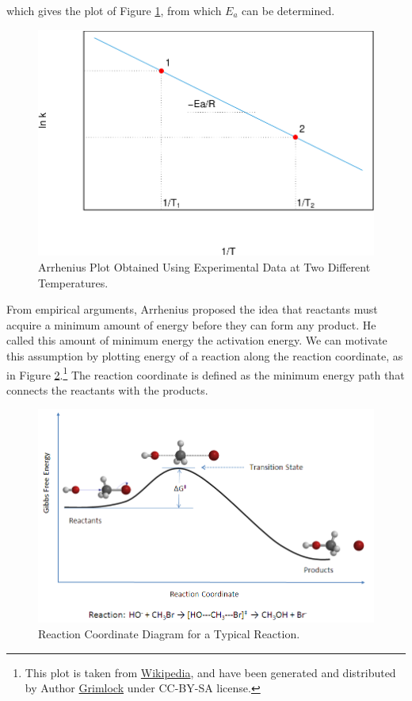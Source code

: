 \documentclass[
  9pt,
]{extbook}
\theoremstyle{definition}
\theoremstyle{definition}
\theoremstyle{definition}
\theoremstyle{remark}
\begin{document}
which gives the plot of Figure \ref{fig:figk8}, from which \(E_a\) can be determined.

\begin{figure}

{\centering \includegraphics{pchem1_files/figure-latex/figk8-1} 

}

\caption{Arrhenius Plot Obtained Using Experimental Data at Two Different Temperatures.}\label{fig:figk8}
\end{figure}

From empirical arguments, Arrhenius proposed the idea that reactants must acquire a minimum amount of energy before they can form any product. He called this amount of minimum energy the activation energy. We can motivate this assumption by plotting energy of a reaction along the reaction coordinate, as in Figure \ref{fig:figk9}.\footnote{This plot is taken from \href{https://en.wikipedia.org/wiki/Transition_state_theory}{Wikipedia}, and have been generated and distributed by Author \href{https://commons.wikimedia.org/wiki/User:Grimlock}{Grimlock} under CC-BY-SA license.} The reaction coordinate is defined as the minimum energy path that connects the reactants with the products.

\begin{figure}

{\centering \includegraphics[width=0.7\linewidth]{./img/Rxn_coordinate_diagram_5} 

}

\caption{Reaction Coordinate Diagram for a Typical Reaction.}\label{fig:figk9}
\end{figure}
\end{document}
